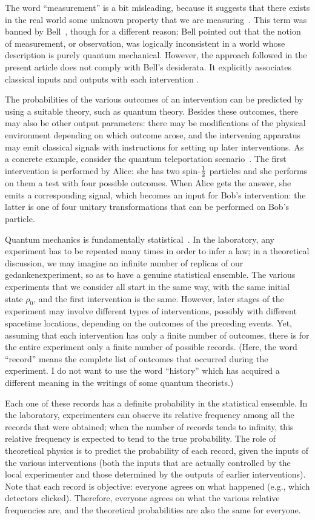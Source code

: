 \documentclass[12pt]{article}
\begin{document}
The word ``measurement'' is a bit misleading, because it suggests that
there exists in the real world some unknown property that we are
measuring~\cite{qt}. This term was banned by Bell~\cite{Bell}, though
for a different reason: Bell pointed out that the notion of measurement,
or observation, was logically inconsistent in a world whose description
is purely quantum mechanical. However, the approach followed in the
present article does not comply with Bell's desiderata. It explicitly
associates classical inputs and outputs with each intervention
\cite{BJ,percival}.

The probabilities of the various outcomes of an intervention can be
predicted by using a suitable theory, such as quantum theory. Besides
these outcomes, there may also be other output parameters: there may
be modifications of the physical environment depending on which outcome
arose, and the intervening apparatus may emit classical signals with
instructions for setting up later interventions. As a concrete example,
consider the quantum teleportation scenario~\cite{telep}. The first
intervention is performed by Alice: she has two spin-$1\over2$ particles
and she performs on them a test with four possible outcomes. When Alice
gets the answer, she emits a corresponding signal, which becomes an
input for Bob's intervention: the latter is one of four unitary
transformations that can be performed on Bob's particle. 

Quantum mechanics is fundamentally statistical~\cite{Bal}. In the
laboratory, any experiment has to be repeated many times in order to
infer a law; in a theoretical discussion, we may imagine an infinite
number of replicas of our gedanken\-experiment, so as to have a genuine
statistical ensemble. The various experiments that we consider all start
in the same way, with the same initial state $\rho_0$, and the first
intervention is the same. However, later stages of the experiment may
involve different types of interventions, possibly with different
spacetime locations, depending on the outcomes of the preceding events.
Yet, assuming that each intervention has only a finite number of
outcomes, there is for the entire experiment only a finite number of
possible records. (Here, the word ``record'' means the complete list of
outcomes that occurred during the experiment. I do not want to use the
word ``history'' which has acquired a different meaning in the writings
of some quantum theorists.)

Each one of these records has a definite probability in the statistical
ensemble. In the laboratory, experimenters can observe its relative
frequency among all the records that were obtained; when the number of
records tends to infinity, this relative frequency is expected to tend
to the true probability. The role of theoretical physics is to predict
the probability of each record, given the inputs of the various
interventions (both the inputs that are actually controlled by the local
experimenter and those determined by the outputs of earlier
interventions). Note that each record is objective: everyone agrees on
what happened (e.g., which detectors clicked). Therefore, everyone
agrees on what the various relative frequencies are, and the theoretical
probabilities are also the same for everyone.
\end{document}
